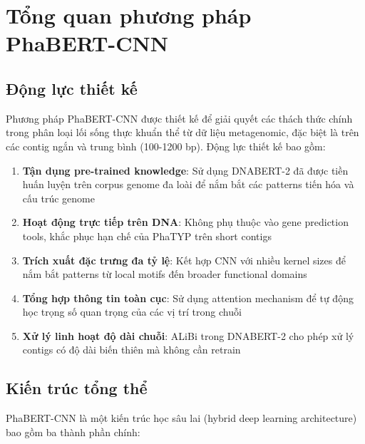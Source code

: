 \section{Tổng quan phương pháp PhaBERT-CNN}
\label{sec:overview}

\subsection{Động lực thiết kế}

Phương pháp PhaBERT-CNN được thiết kế để giải quyết các thách thức chính trong phân loại lối sống thực khuẩn thể từ dữ liệu metagenomic, đặc biệt là trên các contig ngắn và trung bình (100-1200 bp). Động lực thiết kế bao gồm:

\begin{enumerate}
    \item \textbf{Tận dụng pre-trained knowledge}: Sử dụng DNABERT-2 đã được tiền huấn luyện trên corpus genome đa loài để nắm bắt các patterns tiến hóa và cấu trúc genome

    \item \textbf{Hoạt động trực tiếp trên DNA}: Không phụ thuộc vào gene prediction tools, khắc phục hạn chế của PhaTYP trên short contigs

    \item \textbf{Trích xuất đặc trưng đa tỷ lệ}: Kết hợp CNN với nhiều kernel sizes để nắm bắt patterns từ local motifs đến broader functional domains

    \item \textbf{Tổng hợp thông tin toàn cục}: Sử dụng attention mechanism để tự động học trọng số quan trọng của các vị trí trong chuỗi

    \item \textbf{Xử lý linh hoạt độ dài chuỗi}: ALiBi trong DNABERT-2 cho phép xử lý contigs có độ dài biến thiên mà không cần retrain
\end{enumerate}

\subsection{Kiến trúc tổng thể}

PhaBERT-CNN là một kiến trúc học sâu lai (hybrid deep learning architecture) bao gồm ba thành phần chính:


